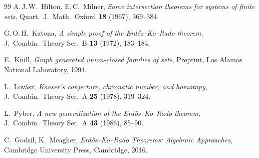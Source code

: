 \documentclass[12pt,a4paper]{amsart}
\theoremstyle{definition}
\theoremstyle{remark}
\begin{document}
\begin{thebibliography}{99}
A.\,J.\,W.~Hilton, E.\,C.~Milner,
\textit{Some intersection theorems for systems of finite sets},
Quart.\ J.\ Math.\ Oxford \textbf{18} (1967), 369--384.

G.\,O.\,H.~Katona,
\textit{A simple proof of the Erdős--Ko--Rado theorem},
J.\ Combin.\ Theory Ser.\ B \textbf{13} (1972), 183--184.

E.~Knill,
\textit{Graph generated union-closed families of sets},
Preprint, Los Alamos National Laboratory, 1994.

L.~Lov\'asz,
\textit{Kneser's conjecture, chromatic number, and homotopy},
J.\ Combin.\ Theory Ser.\ A \textbf{25} (1978), 319--324.

L.~Pyber,
\textit{A new generalization of the Erdős--Ko--Rado theorem},
J.\ Combin.\ Theory Ser.\ A \textbf{43} (1986), 85--90.

C.~Godsil, K.~Meagher,
\textit{Erd\H{o}s--Ko--Rado Theorems: Algebraic Approaches},
Cambridge University Press, Cambridge, 2016.

\end{thebibliography}
\end{document}
